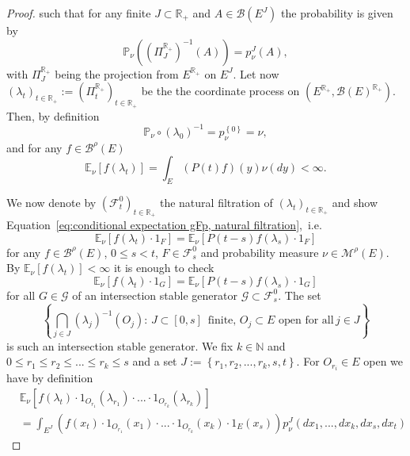 \documentclass[a4paper,12pt]{article}
\theoremstyle{definition}
\theoremstyle{remark}
\numberwithin{equation}{section}
\numberwithin{theorem}{section}
\begin{document}
\begin{proof}
such that for any finite $J\subset\mathbb{R}_{+}$ and
$
A\in\mathcal{B}(E^J)$
 the probability is given by
\begin{equation}
\mathbb{P}_{\nu}\left(\left(\Pi_{J}^{\mathbb{R}_{+}}\right)^{-1}\left(A\right)\right)=p_{\nu}^{J}(A)\label{eq:projectivity of measure},
\end{equation}
with $\Pi_{J}^{\mathbb{R}_{+}}$ being the projection from $E^{\mathbb{R}_{+}}$
on $E^{J}$. 
Let now $\left(\lambda_{t}\right)_{t\in\mathbb{R}_{+}}:=\left(\Pi_{t}^{\mathbb{R}_{+}}\right)_{t\in\mathbb{R}_{+}}$
be the the coordinate process 
on $\left(E^{\mathbb{R}_{+}},\mathcal{B}(E)^{\mathbb{R}_{+}}\right)$.
Then, 
by definition 
\[
\mathbb{P}_{\nu}\circ\left(\lambda_{0}\right)^{-1}=p_{\nu}^{\left\{ 0\right\} }=\nu,
\]
 and for any $f\in\mathcal{\mathscr{B}}^{\rho}(E)$
\[
\mathbb{E}_{\nu}\left[f(\lambda_{t})\right]=\int_{E}\left(P(t)f\right)(y)\nu(dy)<\infty.
\]


We now denote by $\left(\mathcal{F}_{t}^{0}\right)_{t\in\mathbb{R}_{+}}$ the natural filtration of $(\lambda_t)_{t \in \mathbb{R}_+}$ and show Equation~\eqref{eq:conditional expectation gFp, natural filtration},~i.e.~
\[
\mathbb{E}_{\nu}\left[f(\lambda_{t})\cdot1_{F}\right]=\mathbb{E}_{\nu}\left[P\left(t-s\right)f(\lambda_{s})\cdot1_{F}\right]
\]
for any $f\in\mathcal{\mathscr{B}}^{\rho}(E)$,
 $0\leq s<t$, $F\in\mathcal{F}_{s}^{0}$ and  probability measure  $\nu\in\mathcal{M}^{\rho}(E)$. By $\mathbb{E}_{\nu}\left[f(\lambda_{t})\right]<\infty$
 it is
enough to check 
\[
\mathbb{E}_{\nu}\left[f(\lambda_{t})\cdot1_{G}\right]=\mathbb{E}_{\nu}\left[P\left(t-s\right)f(\lambda_{s})\cdot1_{G}\right]
\]
for all $G\in\mathcal{G}$ of an intersection stable generator $\mathcal{G}\subset\mathcal{F}_{s}^{0}$.
The set 
\[
\left\{ \underset{j\in J}{\bigcap}\left(\lambda_{j}\right)^{-1}\left(O_{j}\right):\,J\subset\left[0,s \right]\,\text{ finite, }O_{j}\subset E\text{ open for all}\,j\in J\right\} 
\]
is such an intersection stable generator. We
fix $k\in\mathbb{N}$ and $0\leq r_{1}\leq r_{2}\leq...\leq r_{k}\leq s$
and a set $J:=\left\{ r_{1},r_{2},...,r_{k},s,t\right\} .$ For
$O_{r_{i}}\in E$ open we have by
definition 
\begin{align*}
 & \mathbb{E}_{\nu}\left[f(\lambda_{t})\cdot1_{O_{r_{1}}}\left(\lambda_{r_{1}}\right)\cdot...\cdot1_{O_{r_{k}}}\left(\lambda_{r_{k}}\right)\right]\\
 & =\int_{E^{J}}\left(f(x_t)\cdot1_{O_{r_{1}}}\left(x_{1}\right)\cdot...\cdot1_{O_{r_{k}}}\left(x_{k}\right)\cdot1_{E}(x_{s})\right)p_{\nu}^{J}(dx_{1},...,dx_{k},dx_s,dx_t)
\end{align*}


\end{proof}
\end{document}
